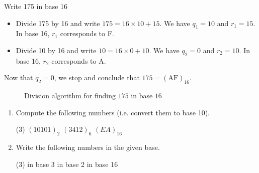 \begin{frame}[t]
\begin{ex}
Write 175 in base 16
\end{ex}
\begin{sol}
\begin{itemize}
\item Divide 175 by 16 and write $175 = 16 \times 10 + 15$. We have $q_1 = 10$ and $r_1 = 15$. In base 16, $r_1$ corresponds to F.
\item Divide 10 by 16 and write $10 = 16 \times 0 + 10$. We have $q_2 = 0$ and $r_2 = 10$. In base 16, $r_2$ corresponds to A.
\end{itemize}
Now that $q_2 = 0$, we stop and conclude that $175 = (\text{AF})_{16}$.
\end{sol}
\end{frame}


\begin{frame}{}
\begin{figure}[h!]
\centering
{}
\caption{Division algorithm for finding $175$ in base $16$}
\end{figure}
\end{frame}

\begin{frame}
\begin{exercisebox}{}{}
\begin{enumerate}
\item Compute the following numbers (i.e. convert them to base 10).
\begin{tasks}(3)
\task $(10101)_2$
\task $(3412)_6$
\task $(EA)_{16}$
\end{tasks}
\item Write the following numbers in the given base.
\begin{tasks}(3)
 in base 3
 in base 2
 in base 16
\end{tasks}
\end{enumerate}
\end{exercisebox}
\end{frame}

